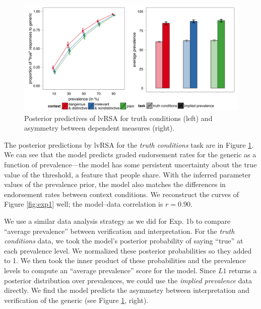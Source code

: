 \documentclass[10pt,letterpaper]{article}
\begin{document}
\begin{figure}
\centering
    \includegraphics[width=\columnwidth]{lvRSA_postpreds}
    \caption{Posterior predictives of lvRSA for truth conditions (left) and asymmetry between dependent measures (right).}
  \label{fig:lvRSAposteriorpred}
\end{figure}


The posterior predictions by lvRSA for the \emph{truth conditions} task are in Figure \ref{fig:lvRSAposteriorpred}. 
We can see that the model predicts graded endorsement rates for the generic as a function of prevalence---the model has some persistent uncertainty about the true value of the threshold, a feature that people share.
With the inferred parameter values of the prevalence prior, the model also matches the differences in endorsement rates between context conditions.
We reconstruct the curves of Figure \ref{fig:exp1} well; the model--data correlation is $r = 0.90$.


We use a similar data analysis strategy as we did for Exp. 1b to compare ``average prevalence'' between verification and interpretation. For the \emph{truth conditions} data, we took the model's posterior probability of saying ``true'' at each prevalence level. We normalized these posterior probabilities so they added to 1. We then took the inner product of these probabilities and the prevalence levels to compute an ``average prevalence'' score for the model. Since $L1$ returns a posterior distribution over prevalences, we could use the \emph{implied prevalence} data directly. We find the model predicts the asymmetry between interpretation and verification of the generic (see Figure \ref{fig:lvRSAposteriorpred}, right).
\end{document}
